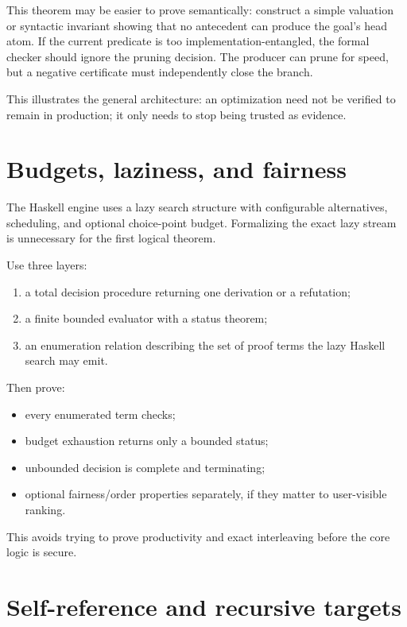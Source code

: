 \documentclass[11pt,letterpaper,openany]{report}
\theoremstyle{definition}
\theoremstyle{remark}
\begin{document}
This theorem may be easier to prove semantically: construct a simple valuation or syntactic invariant showing that no antecedent can produce the goal's head atom. If the current predicate is too implementation-entangled, the formal checker should ignore the pruning decision. The producer can prune for speed, but a negative certificate must independently close the branch.

This illustrates the general architecture: an optimization need not be verified to remain in production; it only needs to stop being trusted as evidence.

\section{Budgets, laziness, and fairness}

The Haskell engine uses a lazy search structure with configurable alternatives, scheduling, and optional choice-point budget. Formalizing the exact lazy stream is unnecessary for the first logical theorem.

Use three layers:

\begin{enumerate}
\item a total decision procedure returning one derivation or a refutation;
\item a finite bounded evaluator with a status theorem;
\item an enumeration relation describing the set of proof terms the lazy Haskell search may emit.
\end{enumerate}

Then prove:

\begin{itemize}
\item every enumerated term checks;
\item budget exhaustion returns only a bounded status;
\item unbounded decision is complete and terminating;
\item optional fairness/order properties separately, if they matter to user-visible ranking.
\end{itemize}

This avoids trying to prove productivity and exact interleaving before the core logic is secure.

\section{Self-reference and recursive targets}
\end{document}
